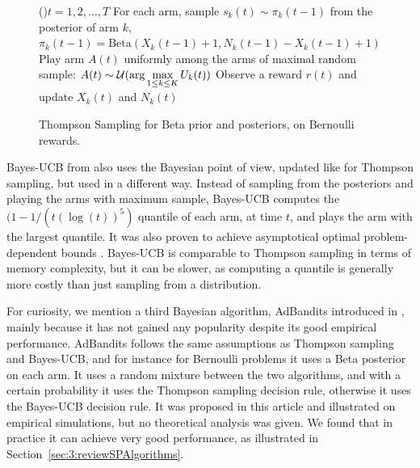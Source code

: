 \begin{figure}[h!]
	\centering
    \begin{framed}
	\begin{algorithm}[H]
		\For(){$t = 1, 2, \dots, T$}{
            For each arm, sample $s_k(t) \sim \pi_k(t-1)$ from the posterior of arm $k$, $\pi_k(t-1)=\mathrm{Beta}(X_k(t-1)+1,N_k(t-1)-X_k(t-1)+1)$\;
            Play arm $A(t)$ uniformly among the arms of maximal random sample: $A(t) \sim \mathcal{U}(\arg\max\limits_{1\leq k \leq K} U_k(t))$\;
            Observe a reward $r(t)$ and update $X_k(t)$ and $N_k(t)$\;
		}
		\caption{Thompson Sampling for Beta prior and posteriors, on Bernoulli rewards.}
		\label{algo:2:ThompsonSampling}
	\end{algorithm}
	\end{framed}
\end{figure}


Bayes-UCB from \cite{Kaufmann12BUCB} also uses the Bayesian point of view, updated like for Thompson sampling, but used in a different way.
Instead of sampling from the posteriors and playing the arms with maximum sample, Bayes-UCB computes the $(1-1/(t (\log(t))^5)$ quantile of each arm, at time $t$, and plays the arm with the largest quantile.
It was also proven to achieve asymptotical optimal problem-dependent bounds \cite{Kaufmann12BUCB}.
%
Bayes-UCB is comparable to Thompson sampling in terms of memory complexity, but it can be slower, as computing a quantile is generally more costly than just sampling from a distribution.

For curiosity, we mention a third Bayesian algorithm, AdBandits introduced in \cite{Truzzi13}, mainly because it has not gained any popularity despite its good empirical performance.
AdBandits follows the same assumptions as Thompson sampling and Bayes-UCB, and for instance for Bernoulli problems it uses a Beta posterior on each arm.
It uses a random mixture between the two algorithms, and with a certain probability it uses the Thompson sampling decision rule, otherwise it uses the Bayes-UCB decision rule.
It was proposed in this article \cite{Truzzi13} and illustrated on empirical simulations, but no theoretical analysis was given.
We found that in practice it can achieve very good performance, as illustrated in Section~\ref{sec:3:reviewSPAlgorithms}.

